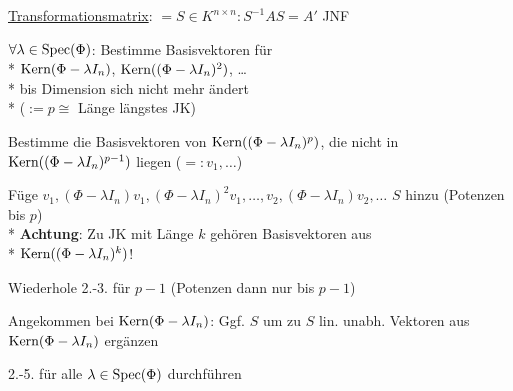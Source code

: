 \begin{items}
    \newpage

  \item \underline{Transformationsmatrix}: \( = S \in K^{n \times n} : S^{-1}AS = A' \) JNF
    \begin{enumeration}
      \item \( \forall \lambda \in \text{Spec}(\Phi) \): Bestimme Basisvektoren für 
        \\*
        \( \text{Kern}(\Phi - \lambda I_n) \), \( \text{Kern}((\Phi - \lambda I_n)^2) \), \dots
        \\*
        bis Dimension sich nicht mehr ändert \\* (\( := p \cong \) Länge längstes JK)
      \item Bestimme die Basisvektoren von \( \text{Kern}((\Phi - \lambda I_n)^p) \), die nicht in \( \text{Kern}((\Phi - \lambda I_n)^{p-1}) \) liegen (\( =: v_1, \dots \))
      \item Füge \( v_1, (\Phi - \lambda I_n)v_1, (\Phi-\lambda I_n)^2v_1, \dots, v_2, (\Phi - \lambda I_n)v_2, \dots \) \( S \) hinzu (Potenzen bis \( p \)) \\*
        \textbf{Achtung}: Zu JK mit Länge \( k \) gehören Basisvektoren aus \\* \phantom{x} \( \text{Kern}((\Phi - \lambda I_n)^k) \)!
      \item Wiederhole 2.-3. für \( p-1 \) (Potenzen dann nur bis \( p-1 \))
      \item Angekommen bei \( \text{Kern}(\Phi - \lambda I_n) \): Ggf. \( S \) um zu \( S \) lin. unabh. Vektoren aus \( \text{Kern}(\Phi - \lambda I_n) \) ergänzen
      \item 2.-5. für alle \( \lambda \in \text{Spec}(\Phi) \) durchführen
    \end{enumeration}

    
\end{items}